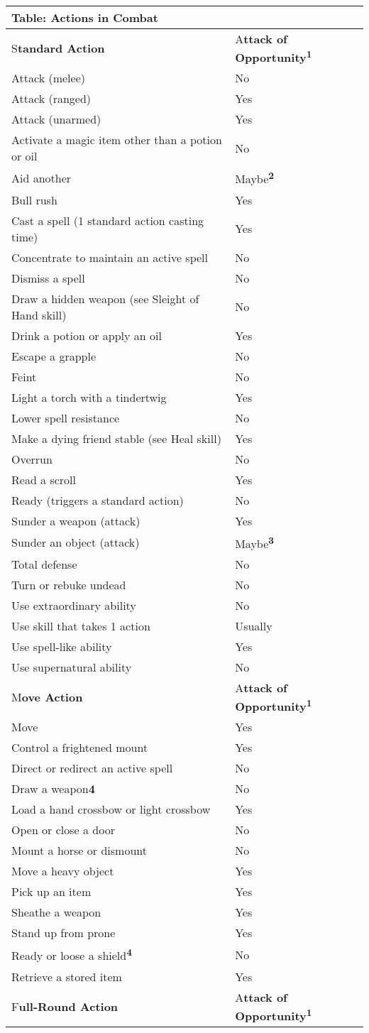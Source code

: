 \documentclass{article}
\begin{document}
\vspace{12pt}
\begin{tabular}{|>{\raggedright}p{193pt}|>{\raggedright}p{94pt}|}
\hline
T\textbf{able: Actions in Combat} & \tabularnewline
\hline
S\textbf{tandard Action} & A\textbf{ttack of Opportunity}\textsuperscript{\textbf{1}}\tabularnewline
\hline
Attack (melee) & No\tabularnewline
\hline
Attack (ranged) & Yes\tabularnewline
\hline
Attack (unarmed) & Yes\tabularnewline
\hline
Activate a magic item other than a potion or oil & No\tabularnewline
\hline
Aid another & Maybe\textsuperscript{\textbf{2}}\tabularnewline
\hline
Bull rush & Yes\tabularnewline
\hline
Cast a spell (1 standard action casting time) & Yes\tabularnewline
\hline
Concentrate to maintain an active spell & No\tabularnewline
\hline
Dismiss a spell & No\tabularnewline
\hline
Draw a hidden weapon (see Sleight of Hand skill) & No\tabularnewline
\hline
Drink a potion or apply an oil & Yes\tabularnewline
\hline
Escape a grapple & No\tabularnewline
\hline
Feint & No\tabularnewline
\hline
Light a torch with a tindertwig & Yes\tabularnewline
\hline
Lower spell resistance & No\tabularnewline
\hline
Make a dying friend stable (see Heal skill) & Yes\tabularnewline
\hline
Overrun & No\tabularnewline
\hline
Read a scroll & Yes\tabularnewline
\hline
Ready (triggers a standard action) & No\tabularnewline
\hline
Sunder a weapon (attack) & Yes\tabularnewline
\hline
Sunder an object (attack) & Maybe\textsuperscript{\textbf{3}}\tabularnewline
\hline
Total defense & No\tabularnewline
\hline
Turn or rebuke undead & No\tabularnewline
\hline
Use extraordinary ability & No\tabularnewline
\hline
Use skill that takes 1 action & Usually\tabularnewline
\hline
Use spell-like ability & Yes\tabularnewline
\hline
Use supernatural ability & No\tabularnewline
\hline
M\textbf{ove Action} & A\textbf{ttack of Opportunity}\textsuperscript{\textbf{1}}\tabularnewline
\hline
Move & Yes\tabularnewline
\hline
Control a frightened mount & Yes\tabularnewline
\hline
Direct or redirect an active spell & No\tabularnewline
\hline
Draw a weapon\textbf{4} & No\tabularnewline
\hline
Load a hand crossbow or light crossbow & Yes\tabularnewline
\hline
Open or close a door & No\tabularnewline
\hline
Mount a horse or dismount & No\tabularnewline
\hline
Move a heavy object & Yes\tabularnewline
\hline
Pick up an item & Yes\tabularnewline
\hline
Sheathe a weapon & Yes\tabularnewline
\hline
Stand up from prone & Yes\tabularnewline
\hline
Ready or loose a shield\textsuperscript{\textbf{4}} & No\tabularnewline
\hline
Retrieve a stored item & Yes\tabularnewline
\hline
F\textbf{ull-Round Action} & A\textbf{ttack of Opportunity}\textsuperscript{\textbf{1}}\tabularnewline

\end{tabular}
\end{document}
